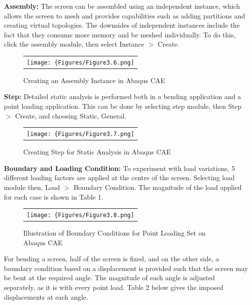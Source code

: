 \documentclass[a4paper,12pt]{article}
\numberwithin{equation}{section}
\numberwithin{figure}{section}
\begin{document}
\noindent \textbf{Assembly:} The screen can be assembled using an independent instance, which allows the screen to mesh and provides capabilities such as adding partitions and creating virtual topologies. The downsides of independent instances include the fact that they consume more memory and be meshed individually. To do this, click the assembly module, then select Instance $>$ Create.\vspace{\baselineskip}

\begin{figure}[H]
  \centering
  \begin{tabular}{@{}c@{}}
    \texttt{[image: \{Figures/Figure3.6.png]}} \\
  \end{tabular}
  \caption {Creating an Assembly Instance in Abaqus CAE}
\end{figure}

\noindent \textbf{Step:} Detailed static analysis is performed both in a bending application and a point loading application. This can be done by selecting step module, then Step $>$ Create, and choosing Static, General.\vspace{\baselineskip}

\begin{figure}[H]
  \centering
  \begin{tabular}{@{}c@{}}
    \texttt{[image: \{Figures/Figure3.7.png]}} \\
  \end{tabular}
  \caption {Creating Step for Static Analysis in Abaqus CAE}
\end{figure}

\noindent \textbf{Boundary and Loading Condition:} To experiment with load variations, 5 different loading factors are applied at the centre of the screen. Selecting load module then, Load $>$ Boundary Condition. The magnitude of the load applied for each case is shown in Table 1.\vspace{\baselineskip}

\begin{figure}[H]
  \centering
  \begin{tabular}{@{}c@{}}
    \texttt{[image: \{Figures/Figure3.8.png]}} \\
  \end{tabular}
  \caption {Illustration of Boundary Conditions for Point Loading Set on Abaqus CAE}
\end{figure}

\noindent For bending a screen, half of the screen is fixed, and on the other side, a boundary condition based on a displacement is provided such that the screen may be bent at the required angle. The magnitude of each angle is adjusted separately, as it is with every point load. Table 2 below gives the imposed displacements at each angle.\vspace{\baselineskip}
\end{document}
